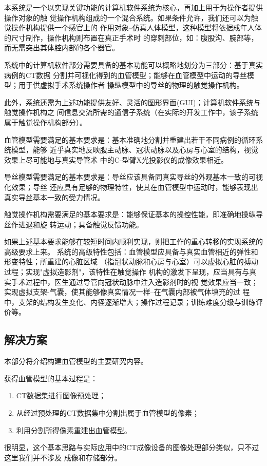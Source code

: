 本系统是一个以实现关键功能的计算机软件系统为核心，再加上用于为操作者提供操作对象的触
觉操作机构组成的一个混合系统。如果条件允许，我们还可以为触觉操作机构提供一个感官上的
作用对象--仿真人体模型，这种模型将依据成年人体的尺寸制作，操作机构则布置在真正手术时
的穿刺部位，如：腹股沟、腕部等，而无需突出其体腔内部的各个器官。

系统中的计算机软件部分需要具备的基本功能可以概略地划分为三部分：基于真实病例的CT数据
分割并可视化得到的血管模型；能够在血管模型中运动的导丝模型；用于供虚拟手术系统操作者
操纵模型中的导丝的物理的触觉操作机构。

此外，系统还需为上述功能提供友好、灵活的图形界面(GUI)；计算机软件系统与触觉操作机构之
间信息交流所需的通信子系统（在实际的开发工作中，该子系统属于触觉操作机构部分）。

血管模型需要满足的基本要求是：基本准确地分割并重建出若干不同病例的循环系统模型，能够
近乎真实地反映腹主动脉、冠状动脉以及心房与心室的结构，视觉效果上尽可能地与真实导管术
中的C-型臂X光投影仪的成像效果相近。

导丝模型需要满足的基本要求是：导丝应该具备同真实导丝的外观基本一致的可视化效果；导丝
还应具有足够的物理特性，使其在血管模型中运动时，能够表现出真实导丝基本一致的受力情况。

触觉操作机构需要满足的基本要求是：能够保证基本的操控性能，即准确地操纵导丝作进退和旋
转运动；具备触觉反馈功能。

如果上述基本要求能够在较短时间内顺利实现，则把工作的重心转移的实现系统的高级要求上来。
系统的高级特性包括：血管模型应具备与真实血管相近的弹性和形变特性；所重建的心脏区域
（指冠状动脉和心房与心室）可以虚拟心脏的搏动过程；实现"虚拟造影剂"，该特性在触觉操作
机构的激发下呈现，应当具有与真实手术过程中，医生通过导管向冠状动脉中注入造影剂时的视
觉效果应当一致；实现虚拟支架-气囊，使其能够像真实情况一样--在气囊内部被气体填充的过
程中，支架的结构发生变化、内径逐渐增大；操作过程记录；训练难度分级与训练评价等。

\subsection{解决方案}
\label{subsec1-1-3}

本部分将介绍构建血管模型的主要研究内容。

获得血管模型的基本过程是：
\begin{enumerate}
  \item CT数据集进行图像预处理；
  \item 从经过预处理的CT数据集中分割出属于血管模型的像素；
  \item 利用分割所得像素重建出血管模型。
\end{enumerate}
很明显，这个基本思路与实际应用中的CT成像设备的图像处理部分类似，只不过这里我们并不涉及
成像和存储部分。

